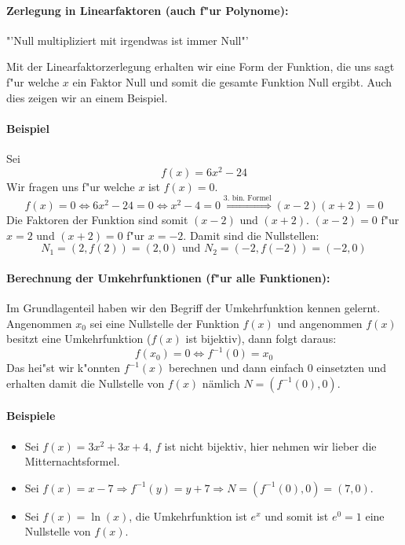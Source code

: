\paragraph{Zerlegung in Linearfaktoren (auch f"ur Polynome):}
\begin{center}
"'Null multipliziert mit irgendwas ist immer Null"'
\end{center}
Mit der Linearfaktorzerlegung erhalten wir eine Form der Funktion, die uns sagt f"ur welche $x$ ein Faktor Null und somit die gesamte Funktion Null ergibt. Auch dies zeigen wir an einem Beispiel.

\paragraph{Beispiel}
Sei
\begin{equation*}
f(x) = 6x^2 - 24
\end{equation*}
Wir fragen uns f"ur welche $x$ ist $f(x) = 0$.
\begin{equation*}
f(x) = 0 \iff 6x^2 - 24 = 0 \iff x^2 - 4 = 0 \stackrel{\text{3. bin. Formel}}{\iff} (x-2)(x+2) = 0 
\end{equation*}
Die Faktoren der Funktion sind somit $(x-2)$ und $(x+2)$. $(x-2) = 0$ f"ur $x = 2$ und $(x+2) = 0$ f"ur  $x = -2$. Damit sind die Nullstellen:
\begin{equation*}
N_1 = (2, f(2)) = (2, 0) \text{ und } N_2 = (-2, f(-2)) = (-2, 0)
\end{equation*}

\paragraph{Berechnung der Umkehrfunktionen (f"ur alle Funktionen):}
Im Grundlagenteil haben wir den Begriff der Umkehrfunktion kennen gelernt. Angenommen $x_0$ sei eine Nullstelle der Funktion $f(x)$ und angenommen $f(x)$ besitzt eine Umkehrfunktion ($f(x)$ ist bijektiv), dann folgt daraus:
\begin{equation*}
f(x_0) = 0 \iff f^{-1}(0) = x_0
\end{equation*}
Das hei"st wir k"onnten $f^{-1}(x)$ berechnen und dann einfach $0$ einsetzten und erhalten damit die Nullstelle von $f(x)$ nämlich $N = (f^{-1}(0), 0)$.

\paragraph{Beispiele}
\begin{itemize}
\item Sei $f(x) = 3x^2 + 3x + 4$, $f$ ist nicht bijektiv, hier nehmen wir lieber die Mitternachtsformel.
\item Sei $f(x) = x - 7 \Rightarrow f^{-1}(y) = y + 7 \Rightarrow N = (f^{-1}(0), 0) = (7, 0)$.
\item Sei $f(x) = \ln(x)$, die Umkehrfunktion ist $e^x$ und somit ist $e^0 = 1$ eine Nullstelle von $f(x)$.
\end{itemize}

